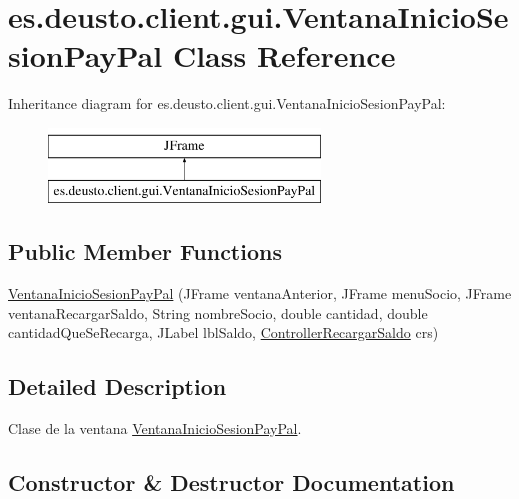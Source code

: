 \hypertarget{classes_1_1deusto_1_1client_1_1gui_1_1_ventana_inicio_sesion_pay_pal}{}\section{es.\+deusto.\+client.\+gui.\+Ventana\+Inicio\+Sesion\+Pay\+Pal Class Reference}
\label{classes_1_1deusto_1_1client_1_1gui_1_1_ventana_inicio_sesion_pay_pal}
Inheritance diagram for es.\+deusto.\+client.\+gui.\+Ventana\+Inicio\+Sesion\+Pay\+Pal\+:\begin{figure}[H]
\begin{center}
\leavevmode
\includegraphics[height=2.000000cm]{classes_1_1deusto_1_1client_1_1gui_1_1_ventana_inicio_sesion_pay_pal}
\end{center}
\end{figure}
\subsection*{Public Member Functions}
\begin{DoxyCompactItemize}
\item 
\mbox{\hyperlink{classes_1_1deusto_1_1client_1_1gui_1_1_ventana_inicio_sesion_pay_pal_a25efd8dcf1fc7212b038a64c81e7701f}{Ventana\+Inicio\+Sesion\+Pay\+Pal}} (J\+Frame ventana\+Anterior, J\+Frame menu\+Socio, J\+Frame ventana\+Recargar\+Saldo, String nombre\+Socio, double cantidad, double cantidad\+Que\+Se\+Recarga, J\+Label lbl\+Saldo, \mbox{\hyperlink{classes_1_1deusto_1_1client_1_1controllers_1_1_controller_recargar_saldo}{Controller\+Recargar\+Saldo}} crs)
\end{DoxyCompactItemize}


\subsection{Detailed Description}
Clase de la ventana \mbox{\hyperlink{classes_1_1deusto_1_1client_1_1gui_1_1_ventana_inicio_sesion_pay_pal}{Ventana\+Inicio\+Sesion\+Pay\+Pal}}. 

\subsection{Constructor \& Destructor Documentation}
\mbox{\label{classes_1_1deusto_1_1client_1_1gui_1_1_ventana_inicio_sesion_pay_pal_a25efd8dcf1fc7212b038a64c81e7701f}} 
